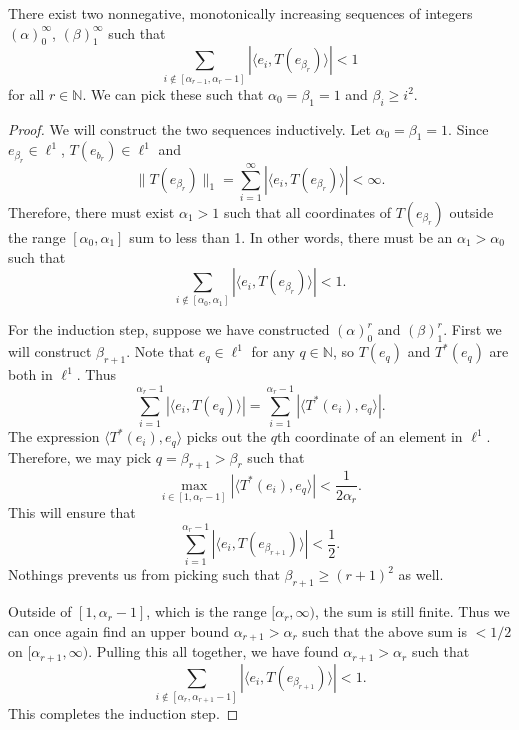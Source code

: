 \documentclass[12pt]{article}
\begin{document}
\begin{proposition}
\label{prop_two_sequences}
	There exist two nonnegative, monotonically increasing sequences of integers $(\alpha)_0^\infty$, $(\beta)_1^\infty$ such that 
	\[
		\sum_{i\not\in [\alpha_{r-1}, \alpha_r-1]}|\langle e_i, T(e_{\beta_r})\rangle |<1
	\]
for all $r\in\mathbb{N}$. We can pick these such that $\alpha_0=\beta_1=1$ and $\beta_i\geq i^2$.
\end{proposition}
\begin{proof}
	We will construct the two sequences inductively. Let $\alpha_0=\beta_1=1$. Since $e_{\beta_r}\in\ell^1$, $T(e_{b_r})\in\ell^1$ and 
	\[
		\|T(e_{\beta_r})\|_1=\sum_{i=1}^\infty |\langle e_i,T(e_{\beta_r})\rangle |<\infty.
	\]
Therefore, there must exist $\alpha_1>1$ such that all coordinates of $T(e_{\beta_r})$ outside the range $[\alpha_0, \alpha_1]$ sum to less than 1. In other words, there must be an $\alpha_1>\alpha_0$ such that
	\[
		\sum_{i\not\in[\alpha_0,\alpha_1]}|\langle e_i, T(e_{\beta_r})\rangle |<1.
	\]

	For the induction step, suppose we have constructed $(\alpha)_0^r$ and $(\beta)_1^r$. First we will construct $\beta_{r+1}$. Note that $e_q\in\ell^1$ for any $q\in\mathbb{N}$, so $T(e_q)$ and $T^\ast (e_q)$ are both in $\ell^1$. Thus
	\[
	\sum_{i=1}^{\alpha_r-1}|\langle e_i, T(e_q)\rangle |=\sum_{i=1}^{\alpha_r-1}|\langle T^\ast (e_i), e_q\rangle |.
	\]
	The expression $\langle T^\ast (e_i), e_q\rangle $ picks out the $q$th coordinate of an element in $\ell^1$. Therefore, we may pick $q=\beta_{r+1}>\beta_r$ such that
	\begin{equation*}
		\max_{i\in[1,\alpha_r-1]}|\langle T^\ast (e_i),e_q\rangle |<\frac{1}{2\alpha_r}.
	\end{equation*}
	This will ensure that
	\[
		\sum_{i=1}^{\alpha_r-1}|\langle e_i, T(e_{\beta_{r+1}})\rangle |<\frac{1}{2}.
	\]
	Nothings prevents us from picking such that $\beta_{r+1}\geq (r+1)^2$ as well.

	Outside of $[1,\alpha_r-1]$, which is the range $[\alpha_r, \infty)$, the sum is still finite. Thus we can once again find an upper bound $\alpha_{r+1}>\alpha_r$ such that the above sum is $<1/2$ on $[\alpha_{r+1},\infty)$. Pulling this all together, we have found $\alpha_{r+1}>\alpha_r$ such that 
	\[
		\sum_{i\not\in[\alpha_{r}, \alpha_{r+1}-1]}|\langle e_i, T(e_{\beta_{r+1}})\rangle |<1.
	\]
	This completes the induction step.
\end{proof}

\end{document}
